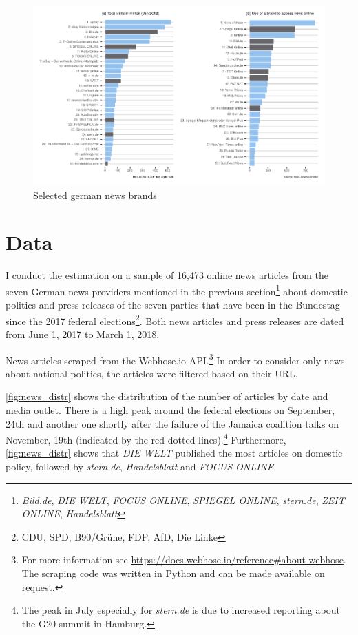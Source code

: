 \documentclass[
]{article}
\begin{document}
\begin{figure}

{\centering \includegraphics[width=1\linewidth]{main_text_files/figure-latex/unnamed-chunk-1-1} 

}

\caption{Selected german news brands \label{fig:news_market}}\label{fig:unnamed-chunk-1}
\end{figure}

\hypertarget{data}{%
\section{Data}\label{data}}

I conduct the estimation on a sample of 16,473 online news articles from
the seven German news providers mentioned in the previous
section\footnote{\emph{Bild.de}, \emph{DIE WELT}, \emph{FOCUS ONLINE},
  \emph{SPIEGEL ONLINE}, \emph{stern.de}, \emph{ZEIT ONLINE},
  \emph{Handelsblatt}} about domestic politics and press releases of the
seven parties that have been in the Bundestag since the 2017 federal
elections\footnote{CDU, SPD, B90/Grüne, FDP, AfD, Die Linke}. Both news
articles and press releases are dated from June 1, 2017 to March 1,
2018.

News articles scraped from the Webhose.io API.\footnote{For more
  information see
  \url{https://docs.webhose.io/reference\#about-webhose}. The scraping
  code was written in Python and can be made available on request.} In
order to consider only news about national politics, the articles were
filtered based on their URL.

\autoref{fig:news_distr} shows the distribution of the number of
articles by date and media outlet. There is a high peak around the
federal elections on September, 24th and another one shortly after the
failure of the Jamaica coalition talks on November, 19th (indicated by
the red dotted lines).\footnote{The peak in July especially for
  \emph{stern.de} is due to increased reporting about the G20 summit in
  Hamburg.} Furthermore, \autoref{fig:news_distr} shows that \emph{DIE
WELT} published the most articles on domestic policy, followed by
\emph{stern.de}, \emph{Handelsblatt} and \emph{FOCUS ONLINE}.
\end{document}
